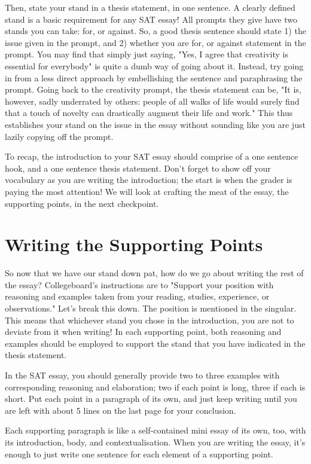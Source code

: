 \documentclass[DIV=calc,11pt,parskip,numbers=noenddot]{scrartcl} %
\begin{document}
Then, state your stand in a thesis statement, in one sentence. A clearly defined stand is a basic requirement for any SAT essay! All prompts they give have two stands you can take: for, or against. So, a good thesis sentence should state 1) the issue given in the prompt, and 2) whether you are for, or against statement in the prompt. You may find that simply just saying, "Yes, I agree that creativity is essential for everybody" is quite a dumb way of going about it. Instead, try going in from a less direct approach by embellishing the sentence and paraphrasing the prompt. Going back to the creativity prompt, the thesis statement can be, "It is, however, sadly underrated by others: people of all walks of life would surely find that a touch of novelty can drastically augment their life and work." This thus establishes your stand on the issue in the essay without sounding like you are just lazily copying off the prompt.

To recap, the introduction to your SAT essay should comprise of a one sentence hook, and a one sentence thesis statement. Don’t forget to show off your vocabulary as you are writing the introduction; the start is when the grader is paying the most attention! We will look at crafting the meat of the essay, the supporting points, in the next checkpoint.
\section{Writing the Supporting Points}
So now that we have our stand down pat, how do we go about writing the rest of the essay? Collegeboard’s instructions are to "Support your position with reasoning and examples taken from your reading, studies, experience, or observations." Let’s break this down. The position is mentioned in the singular. This means that whichever stand you chose in the introduction, you are not to deviate from it when writing! In each supporting point, both reasoning and examples should be employed to support the stand that you have indicated in the thesis statement. 

In the SAT essay, you should generally provide two to three examples with corresponding reasoning and elaboration; two if each point is long, three if each is short. Put each point in a paragraph of its own, and just keep writing until you are left with about 5 lines on the last page for your conclusion.

Each supporting paragraph is like a self-contained mini essay of its own, too, with its introduction, body, and contextualisation. When you are writing the essay, it’s enough to just write one sentence for each element of a supporting point.
\end{document}
